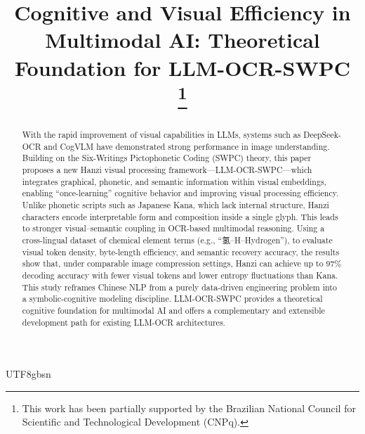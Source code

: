 \documentclass[conference]{IEEEtran}
\begin{document}
\begin{CJK*}{UTF8}{gbsn}%

\title{Cognitive and Visual Efficiency in Multimodal AI:
Theoretical Foundation for LLM-OCR-SWPC\\

\thanks{This work has been partially supported by the Brazilian National Council for Scientific and Technological Development (CNPq).}
}

\author{
\and



}


\maketitle

\begin{abstract}
With the rapid improvement of visual capabilities in LLMs, systems such as DeepSeek-OCR and CogVLM have demonstrated strong performance in image understanding. Building on the Six-Writings Pictophonetic Coding (SWPC) theory, this paper proposes a new Hanzi visual processing framework—LLM-OCR-SWPC—which integrates graphical, phonetic, and semantic information within visual embeddings, enabling “once-learning” cognitive behavior and improving visual processing efficiency.
Unlike phonetic scripts such as Japanese Kana, which lack internal structure, Hanzi characters encode interpretable form and composition inside a single glyph. This leads to stronger visual–semantic coupling in OCR-based multimodal reasoning. Using a cross-lingual dataset of chemical element terms (e.g., “氢–H–Hydrogen”), to evaluate visual token density, byte-length efficiency, and semantic recovery accuracy, the results show that, under comparable image compression settings, Hanzi can achieve up to 97\% decoding accuracy with fewer visual tokens and lower entropy fluctuations than Kana.
This study reframes Chinese NLP from a purely data-driven engineering problem into a symbolic-cognitive modeling discipline. LLM-OCR-SWPC provides a theoretical cognitive foundation for multimodal AI and offers a complementary and extensible development path for existing LLM-OCR architectures.
\end{abstract}


\end{CJK*}
\end{document}

